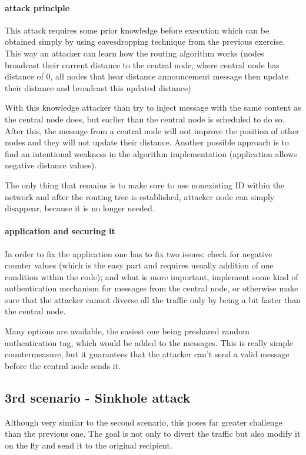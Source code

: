 \documentclass[
  print, %
  table,   %
  nolof,     %
  nolot,     %
           oneside
]{fithesis3}
\begin{document}
    \paragraph{attack principle}
    This attack requires some prior knowledge before execution which can be obtained simply by using eavesdropping technique from the previous exercise. This way an attacker can learn how the routing algorithm works (nodes broadcast their current distance to the central node, where central node has distance of 0, all nodes that hear distance announcement message then update their distance and broadcast this updated distance)

    With this knowledge attacker than try to inject message with the same content as the central node does, but earlier than the central node is scheduled to do so. After this, the message from a central node will not improve the position of other nodes and they will not update their distance. Another possible approach is to find an intentional weakness in the algorithm implementation (application allows negative distance values).

    The only thing that remains is to make sure to use nonexisting ID within the network and after the routing tree is established, attacker node can simply disappear, because it is no longer needed.

    \paragraph{application and securing it}
    In order to fix the application one has to fix two issues; check for negative counter values (which is the easy part and requires usually addition of one condition within the code); and what is more important, implement some kind of authentication mechanism for messages from the central node, or otherwise make sure that the attacker cannot diverse all the traffic only by being a bit faster than the central node.

    Many options are available, the easiest one being preshared random authentication tag, which would be added to the messages. This is really simple countermeasure, but it guarantees that the attacker can't send a valid message before the central node sends it.

    \subsection{3rd scenario - Sinkhole attack}\label{subsec:3rd}
    Although very similar to the second scenario, this poses far greater challenge than the previous one. The goal is not only to divert the traffic but also modify it on the fly and send it to the original recipient.
\end{document}
